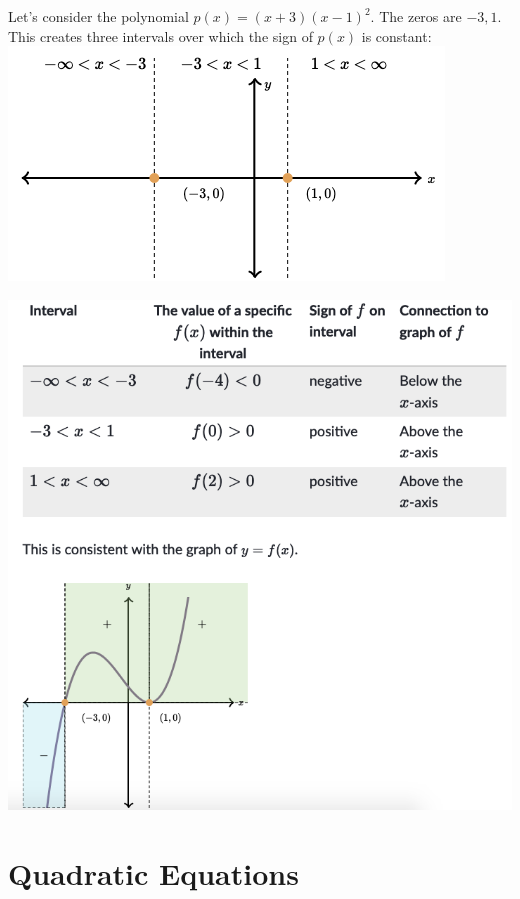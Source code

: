 \documentclass{book}
\begin{document}
	Let's consider the polynomial $p(x) = (x+3)(x-1)^2$. The zeros are $-3,1$. This creates three intervals over which the sign of $p(x)$ is constant:
	\\
	
	\includegraphics[scale=0.5]{pinterval2}
	
	\includegraphics[scale=0.6]{pinterval3}
	
	\chapter{Quadratic Equations}
	
\end{document}
